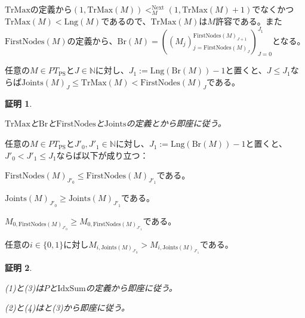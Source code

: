 \documentclass[dvipdfmx,uplatex]{jsarticle}
\theoremstyle{customnonumberbreakfortheorem}
\theoremstyle{customnonumberbreakforproof}
\newtheorem{hideableproof}{証明}
\begin{document}
\(\textrm{TrMax}\)の定義から\((1,\textrm{TrMax}(M)) <_M^{\textrm{Next}} (1,\textrm{TrMax}(M)+1)\)でなくかつ\(\textrm{TrMax}(M) < \textrm{Lng}(M)\)であるので、\(\textrm{TrMax}(M)\)は\(M\)許容である。また\(\textrm{FirstNodes}(M)\)の定義から、\(\textrm{Br}(M) = ((M_j)_{j = \textrm{FirstNodes}(M)_J}^{\textrm{FirstNodes}(M)_{J+1}})_{J=0}^{J_1}\)となる。

\begin{proposition}\label{FirstNodesとTrMaxとJointsの関係}
	任意の\(M \in PT_{\textrm{PS}}\)と\(J \in \mathbb{N}\)に対し、\(J_1 := \textrm{Lng}(\textrm{Br}(M))-1\)と置くと、\(J \leq J_1\)ならば\(\textrm{Joints}(M)_J \leq \textrm{TrMax}(M) < \textrm{FirstNodes}(M)_J\)である。
\end{proposition}

\begin{hideableproof}
	\begin{indented}
		\item \(\textrm{TrMax}\)と\(\textrm{Br}\)と\(\textrm{FirstNodes}\)と\(\textrm{Joints}\)の定義とから即座に従う。
	\end{indented}
\end{hideableproof}

\begin{corollary}\label{FirstNodesとJointsの単調性}
	任意の\(M \in PT_{\textrm{PS}}\)と\(J'_0,J'_1 \in \mathbb{N}\)に対し、\(J_1 := \textrm{Lng}(\textrm{Br}(M))-1\)と置くと、\(J'_0 < J'_1 \leq J_1\)ならば以下が成り立つ：
	\begin{penumerate}
		\item \(\textrm{FirstNodes}(M)_{J'_0} \leq \textrm{FirstNodes}(M)_{J'_1}\)である。
		\item \(\textrm{Joints}(M)_{J'_0} \geq \textrm{Joints}(M)_{J'_1}\)である。
		\item \(M_{0,\textrm{FirstNodes}(M)_{J'_0}} \geq M_{0,\textrm{FirstNodes}(M)_{J'_1}}\)である。
		\item 任意の\(i \in \{0,1\}\)に対し\(M_{i,\textrm{Joints}(M)_{J'_0}} > M_{i,\textrm{Joints}(M)_{J'_1}}\)である。
	\end{penumerate}
\end{corollary}

\begin{hideableproof}
	\begin{indented}
		\item (1)と(3)は\(P\)と\(\textrm{IdxSum}\)の定義から即座に従う。
		\item (2)と(4)はと(3)から即座に従う。
	\end{indented}
\end{hideableproof}
\end{document}
